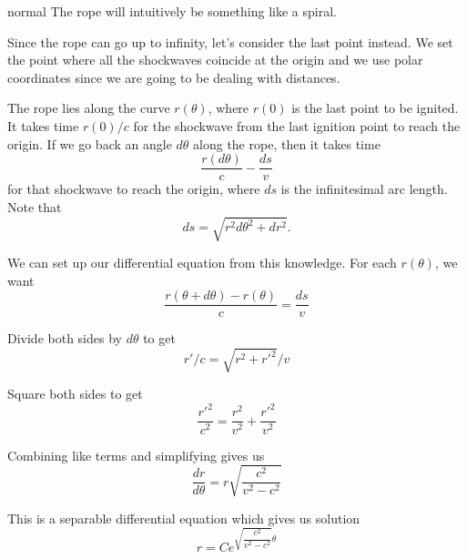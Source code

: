 \begin{solution}{normal}
The rope will intuitively be something like a spiral.\vspace{3mm} 

Since the rope can go up to infinity, let's consider the last point instead. We set the point where all the shockwaves coincide at the origin and we use polar coordinates since we are going to be dealing with distances.\vspace{3mm}

The rope lies along the curve $r(\theta)$, where $r(0)$ is the last point to be ignited. It takes time $r(0)/c$ for the shockwave from the last ignition point to reach the origin. If we go back an angle $d\theta$ along the rope, then it takes time $$\dfrac{r(d\theta)}{c}-\dfrac{ds}{v}$$
for that shockwave to reach the origin, where $ds$ is the infinitesimal arc length. Note that \[ds=\sqrt{r^2d\theta^2+dr^2}.\] 

We can set up our differential equation from this knowledge. For each $r(\theta)$, we want \[\dfrac{r(\theta+d\theta)-r(\theta)}{c}=\dfrac{ds}{v}\]

Divide both sides by $d\theta$ to get \[r'/c=\sqrt{r^2+r'^2}/v\]

Square both sides to get \[\dfrac{r'^2}{c^2}=\dfrac{r^2}{v^2}+\dfrac{r'^2}{v^2}\]

Combining like terms and simplifying gives us \[\frac{dr}{d\theta}=r\sqrt{\frac{c^2}{v^2-c^2}}\]

This is a separable differential equation which gives us solution \[r=\boxed{Ce^{\sqrt{\dfrac{c^2}{v^2-c^2}}\theta}}\]
\end{solution}